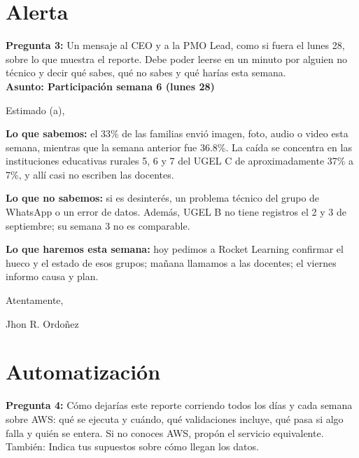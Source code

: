 \documentclass[12pt,a4paper]{article}
\begin{document}
			
	
	\newpage 
	\section{Alerta}
		
		\noindent \textbf{Pregunta 3:} Un mensaje al CEO y a la PMO Lead, como si fuera el 
		lunes 28, sobre lo que muestra el reporte. Debe poder leerse en un minuto por alguien no 
		técnico y decir qué sabes, qué no sabes y qué harías esta semana. \\ [3mm]
	
		\noindent \textbf{Asunto: Participación semana 6 (lunes 28)}
		
		\noindent Estimado (a),
		
		\noindent \textbf{Lo que sabemos:} el 33\% de las familias envió imagen, foto, audio o
		video esta semana, mientras que la semana anterior fue 36.8\%. La caída
		se concentra en las instituciones educativas rurales 5, 6 y 7
		del UGEL C de aproximadamente 37\% a 7\%, y allí casi no
		escriben las docentes.
		
		\noindent \textbf{Lo que no sabemos:} si es desinterés, un problema técnico del grupo de WhatsApp o un error de datos. Además, UGEL
		B no tiene registros el 2 y 3 de septiembre; su semana 3 no es comparable.
		
		\noindent \textbf{Lo que haremos esta semana:} hoy pedimos a Rocket Learning confirmar el hueco y el estado de esos grupos;
		mañana llamamos a las docentes; el viernes informo causa y plan.
		
		\noindent Atentamente,
		
		\noindent Jhon R. Ordoñez
		
	\newpage
	\section{Automatización}
		
		\noindent \textbf{Pregunta 4:} Cómo dejarías este reporte 
		corriendo todos los días y cada semana sobre AWS: qué se ejecuta y cuándo, qué 
		validaciones incluye, qué pasa si algo falla y quién se entera. Si no conoces AWS, propón el 
		servicio equivalente. También: Indica tus supuestos sobre cómo llegan los datos.
	
\end{document}
